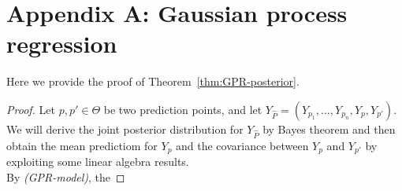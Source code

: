 \section{Appendix A: Gaussian process regression}\label{app:GPR}
Here we provide the proof of Theorem~\ref{thm:GPR-posterior}.
\GPRpost*
\begin{proof}
    Let $p,p' \in \Theta$ be two prediction points, and let $Y_{\hat{P} } = (Y_{p_1}, \ldots, Y_{p_n}, Y_p, Y_{p'})$. 
    We will derive the joint posterior distribution for $Y_{\hat{P}}$ by Bayes theorem and then obtain the mean predictiom for $Y_p$ and the covariance between $Y_p$ and $Y_{p'}$ by exploiting some linear algebra results. \\
    By \textit{(GPR-model)}, the 

\end{proof}
